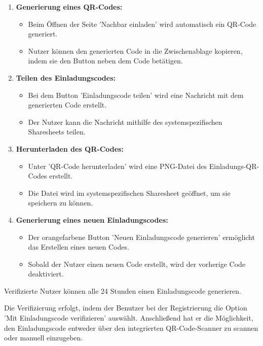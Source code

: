 \begin{enumerate}[label=\arabic*.]
  \item \textbf{Generierung eines QR-Codes:}
        \begin{itemize}
          \item Beim Öffnen der Seite 'Nachbar einladen' wird automatisch ein QR-Code generiert.
          \item Nutzer können den generierten Code in die Zwischenablage kopieren, indem sie den Button neben dem Code betätigen.
        \end{itemize}

  \item \textbf{Teilen des Einladungscodes:}
        \begin{itemize}
          \item Bei dem Button 'Einladungscode teilen' wird eine Nachricht mit dem generierten Code erstellt.
          \item Der Nutzer kann die Nachricht mithilfe des systemspezifischen Sharesheets teilen.
        \end{itemize}

  \item \textbf{Herunterladen des QR-Codes:}
        \begin{itemize}
          \item Unter 'QR-Code herunterladen' wird eine PNG-Datei des Einladungs-QR-Codes erstellt.
          \item Die Datei wird im systemspezifischen Sharesheet geöffnet, um sie speichern zu können.
        \end{itemize}

  \item \textbf{Generierung eines neuen Einladungscodes:}
        \begin{itemize}
          \item Der orangefarbene Button 'Neuen Einladungscode generieren' ermöglicht das Erstellen eines neuen Codes.
          \item Sobald der Nutzer einen neuen Code erstellt, wird der vorherige Code deaktiviert.
        \end{itemize}
\end{enumerate}

Verifizierte Nutzer können alle 24 Stunden einen
Einladungscode generieren.

Die Verifizierung erfolgt, indem der Benutzer bei der
Registrierung die Option 'Mit Einladungscode verifizieren'
auswählt. Anschließend hat er die Möglichkeit, den
Einladungscode entweder über den integrierten
QR-Code-Scanner zu scannen oder manuell einzugeben.


